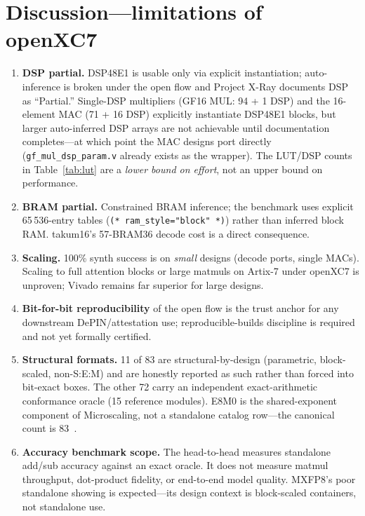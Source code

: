 \documentclass[11pt]{article}
\begin{document}
\section{Discussion---limitations of openXC7}\label{sec:discussion}

\begin{enumerate}[label=\arabic*.,leftmargin=*]
\item \textbf{DSP partial.} DSP48E1 is usable only via explicit instantiation;
  auto-inference is broken under the open flow and Project X-Ray documents DSP
  as ``Partial.'' Single-DSP multipliers (GF16 MUL: 94 + 1 DSP) and the
  16-element MAC (71 + 16 DSP) explicitly instantiate DSP48E1 blocks, but larger
  auto-inferred DSP arrays are not achievable until documentation completes---at
  which point the MAC designs port directly (\texttt{gf\_mul\_dsp\_param.v}
  already exists as the wrapper). The LUT/DSP counts in Table~\ref{tab:lut} are
  a \emph{lower bound on effort}, not an upper bound on performance.

\item \textbf{BRAM partial.} Constrained BRAM inference; the benchmark uses
  explicit 65\,536-entry tables (\texttt{(* ram\_style="block" *)}) rather than
  inferred block RAM. takum16's 57-BRAM36 decode cost is a direct consequence.

\item \textbf{Scaling.} 100\% synth success is on \emph{small} designs (decode
  ports, single MACs). Scaling to full attention blocks or large matmuls on
  Artix-7 under openXC7 is unproven; Vivado remains far superior for large
  designs.

\item \textbf{Bit-for-bit reproducibility} of the open flow is the trust anchor
  for any downstream DePIN/attestation use; reproducible-builds discipline is
  required and not yet formally certified.

\item \textbf{Structural formats.} 11 of 83 are structural-by-design
  (parametric, block-scaled, non-S:E:M) and are honestly reported as such rather
  than forced into bit-exact boxes. The other 72 carry an independent
  exact-arithmetic conformance oracle (15 reference modules). E8M0 is the
  shared-exponent component of Microscaling, not a standalone catalog row---the
  canonical count is 83~\cite{vasilev2026catalog}.

\item \textbf{Accuracy benchmark scope.} The head-to-head measures standalone
  add/sub accuracy against an exact oracle. It does not measure matmul
  throughput, dot-product fidelity, or end-to-end model quality. MXFP8's poor
  standalone showing is expected---its design context is block-scaled
  containers, not standalone use.
\end{enumerate}
\end{document}
